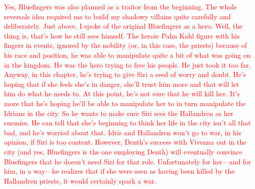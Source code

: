 \textcolor{red}{
Yes, Bluefingers was also planned as a traitor from the beginning. The whole reversals idea required me to build my shadowy villains quite carefully and deliberately.
}
\textcolor{red}{
Just above, I spoke of the original Bluefingers as a hero. Well, the thing is, that’s how he still sees himself. The heroic Pahn Kahl figure with his fingers in events, ignored by the nobility (or, in this case, the priests) because of his race and position, he was able to manipulate quite a bit of what was going on in the kingdom.
}
\textcolor{red}{
He was the hero trying to free his people. He just took it too far.
}
\textcolor{red}{
Anyway, in this chapter, he’s trying to give Siri a seed of worry and doubt. He’s hoping that if she feels she’s in danger, she’ll trust him more and that will let him do what he needs to. At this point, he’s not sure that he will kill her. It’s more that he’s hoping he’ll be able to manipulate her to in turn manipulate the Idrians in the city. So he wants to make sure Siri sees the Hallandren as her enemies. He can tell that she’s beginning to think her life in the city isn’t all that bad, and he’s worried about that. Idris and Hallandren won’t go to war, in his opinion, if Siri is too content.
}
\textcolor{red}{
However, Denth’s success with Vivenna out in the city (and yes, Bluefingers is the one employing Denth) will eventually convince Bluefingers that he doesn’t need Siri for that role. Unfortunately for her—and for him, in a way—he realizes that if she were seen as having been killed by the Hallandren priests, it would certainly spark a war.
}




